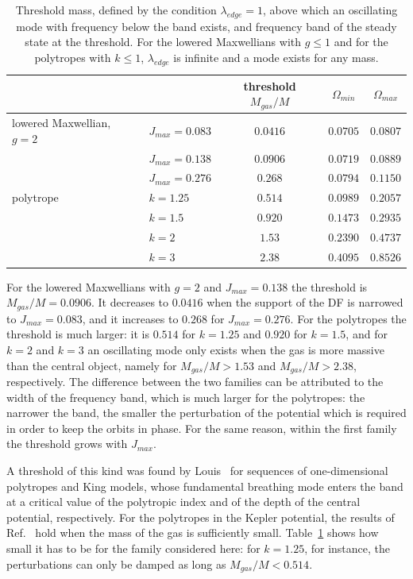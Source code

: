 \begin{table}[htp]
\begin{center}
\begin{tabular}{ll|c|cc}
\hline\hline
 & & threshold $M_{gas}/M$ & $\Omega_{min}$ & $\Omega_{max}$ \\
\hline
lowered Maxwellian, $g = 2$ & $J_{max} = 0.083$ & $0.0416$ & $0.0705$ & $0.0807$ \\
 & $J_{max} = 0.138$ & $0.0906$ & $0.0719$ & $0.0889$ \\
 & $J_{max} = 0.276$ & $0.268$ & $0.0794$ & $0.1150$ \\
\hline
polytrope & $k = 1.25$ & $0.514$ & $0.0989$ & $0.2057$ \\
 & $k = 1.5$ & $0.920$ & $0.1473$ & $0.2935$ \\
 & $k = 2$ & $1.53$ & $0.2390$ & $0.4737$ \\
 & $k = 3$ & $2.38$ & $0.4095$ & $0.8526$ \\
\hline\hline
\end{tabular}
\end{center}
\caption{Threshold mass, defined by the condition $\lambda_{edge} = 1$, above which an oscillating mode with frequency below the band exists, and frequency band of the steady state at the threshold. For the lowered Maxwellians with $g\leq 1$ and for the polytropes with $k\leq 1$, $\lambda_{edge}$ is infinite and a mode exists for any mass.}
\label{Tab:Threshold}
\end{table}

For the lowered Maxwellians with $g = 2$ and $J_{max} = 0.138$ the threshold is $M_{gas}/M = 0.0906$. It decreases to $0.0416$ when the support of the DF is narrowed to $J_{max} = 0.083$, and it increases to $0.268$ for $J_{max} = 0.276$. For the polytropes the threshold is much larger: it is $0.514$ for $k = 1.25$ and $0.920$ for $k = 1.5$, and for $k = 2$ and $k = 3$ an oscillating mode only exists when the gas is more massive than the central object, namely for $M_{gas}/M > 1.53$ and $M_{gas}/M > 2.38$, respectively. The difference between the two families can be attributed to the width of the frequency band, which is much larger for the polytropes: the narrower the band, the smaller the perturbation of the potential which is required in order to keep the orbits in phase. For the same reason, within the first family the threshold grows with $J_{max}$.

A threshold of this kind was found by Louis~\cite{pL92} for sequences of one-dimensional polytropes and King models, whose fundamental breathing mode enters the band at a critical value of the polytropic index and of the depth of the central potential, respectively. For the polytropes in the Kepler potential, the results of Ref.~\cite{mHgRmScS25} hold when the mass of the gas is sufficiently small. Table~\ref{Tab:Threshold} shows how small it has to be for the family considered here: for $k = 1.25$, for instance, the perturbations can only be damped as long as $M_{gas}/M < 0.514$.


